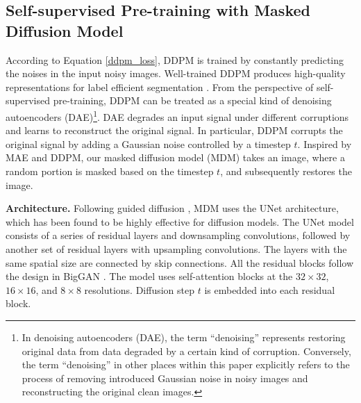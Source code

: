 \documentclass{article} \usepackage{iclr2024_conference,times}
\begin{document}
\subsection{Self-supervised Pre-training with Masked Diffusion Model}
According to Equation \ref{ddpm_loss}, DDPM is trained by constantly predicting the noises in the input noisy images. Well-trained DDPM produces high-quality representations for label efficient segmentation \citep{DBLP:conf/iclr/BaranchukVRKB22}. From the perspective of self-supervised pre-training, DDPM can be treated as a special kind of denoising autoencoders (DAE)\footnote{In denoising autoencoders (DAE), the term ``denoising'' represents restoring original data from data degraded by a certain kind of corruption. Conversely, the term ``denoising'' in other places within this paper explicitly refers to the process of removing introduced Gaussian noise in noisy images and reconstructing the original clean images.}. DAE degrades an input signal under different corruptions and learns to reconstruct the original signal. In particular, DDPM corrupts the original signal by adding a Gaussian noise controlled by a timestep $t$. Inspired by MAE and DDPM, our masked diffusion model (MDM) takes an image, where a random portion is masked based on the timestep $t$, and subsequently restores the image. 

\textbf{Architecture.}
Following guided diffusion \citep{DBLP:conf/nips/DhariwalN21}, MDM uses the UNet architecture, which has been found to be highly effective for diffusion models. 
The UNet model consists of a series of residual layers and downsampling convolutions, followed by another set of residual layers with upsampling convolutions. The layers with the same spatial size are connected by skip connections. All the residual blocks follow the design in BigGAN \citep{DBLP:conf/iclr/BrockDS19}. The model uses self-attention blocks at the $32\times32$, $16\times16$, and $8\times8$ resolutions. Diffusion step $t$ is embedded into each residual block.
\end{document}
